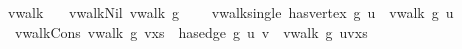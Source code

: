 \isamarkupfalse%
\ vwalk\ \isanewline
\ \ vwalk{\isacharunderscore}{\kern0pt}Nil{\isacharcolon}{\kern0pt}\ {\isachardoublequoteopen}vwalk\ g\ {\isacharbrackleft}{\kern0pt}{\isacharbrackright}{\kern0pt}{\isachardoublequoteclose}\ {\isacharbar}{\kern0pt}\isanewline
\ \ vwalk{\isacharunderscore}{\kern0pt}single{\isacharcolon}{\kern0pt}\ {\isachardoublequoteopen}has{\isacharunderscore}{\kern0pt}vertex\ g\ u\ {\isasymLongrightarrow}\ vwalk\ g\ {\isacharbrackleft}{\kern0pt}u{\isacharbrackright}{\kern0pt}{\isachardoublequoteclose}\ {\isacharbar}{\kern0pt}\isanewline
\ \ vwalk{\isacharunderscore}{\kern0pt}Cons{\isacharcolon}{\kern0pt}\ {\isachardoublequoteopen}vwalk\ g\ {\isacharparenleft}{\kern0pt}v{\isacharhash}{\kern0pt}xs{\isacharparenright}{\kern0pt}\ {\isasymLongrightarrow}\ has{\isacharunderscore}{\kern0pt}edge\ g\ u\ v\ \isanewline{\isasymLongrightarrow}\ vwalk\ g\ {\isacharparenleft}{\kern0pt}u{\isacharhash}{\kern0pt}v{\isacharhash}{\kern0pt}xs{\isacharparenright}{\kern0pt}{\isachardoublequoteclose}\isanewline
